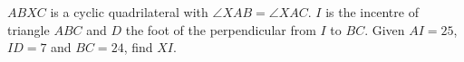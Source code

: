 $ABXC$ is a cyclic quadrilateral with $\angle XAB=\angle XAC$. $I$ is the incentre of triangle $ABC$ and $D$ the foot of the perpendicular from $I$ to $BC$. Given $AI=25$, $ID=7$ and $BC=24$, find $XI$.
